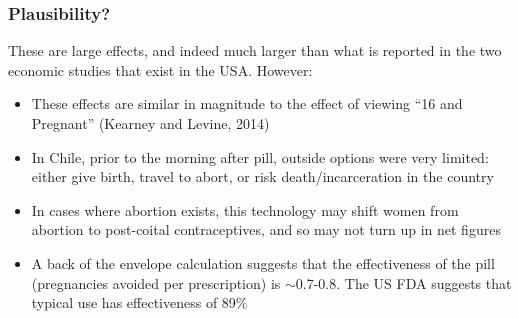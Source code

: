 \documentclass[10pt,letterpaper,subeqn]{beamer}
\begin{document}




\begin{frame}[label=plaus]
\frametitle{Plausibility?}
These are large effects, and indeed much larger than what is reported in the two economic studies that exist in the USA.  However:
\begin{itemize}
\item These effects are similar in magnitude to the effect of viewing ``16 and Pregnant'' (Kearney and Levine, 2014)
\item In Chile, prior to the morning after pill, outside options were very limited: either give birth, travel to abort, or risk death/incarceration in the country
\item In cases where abortion exists, this technology may shift women from abortion to post-coital contraceptives, and so may not turn up in net figures
\item A back of the envelope calculation suggests that the effectiveness of the pill (pregnancies avoided per prescription) is $\sim$0.7-0.8.  The US FDA suggests that typical use has effectiveness of 89\%
\hyperlink{plausR}{}
\end{itemize}
\end{frame}
\end{document}
